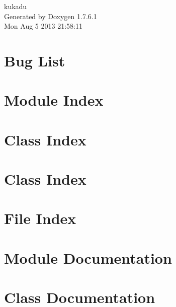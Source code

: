 \documentclass[a4paper]{book}
\begin{document}
\hypersetup{pageanchor=false,citecolor=blue}
\begin{titlepage}
\vspace*{7cm}
\begin{center}
{\Large kukadu }\\
\vspace*{1cm}
{\large \-Generated by Doxygen 1.7.6.1}\\
\vspace*{0.5cm}
{\small Mon Aug 5 2013 21:58:11}\\
\end{center}
\end{titlepage}
\clearemptydoublepage
{}
\tableofcontents
\clearemptydoublepage
{}
\hypersetup{pageanchor=true,citecolor=blue}
\chapter{\-Bug \-List}
\label{bug}
\hypertarget{bug}{}

\chapter{\-Module \-Index}

\chapter{\-Class \-Index}

\chapter{\-Class \-Index}

\chapter{\-File \-Index}

\chapter{\-Module \-Documentation}




\chapter{\-Class \-Documentation}

























\end{document}
